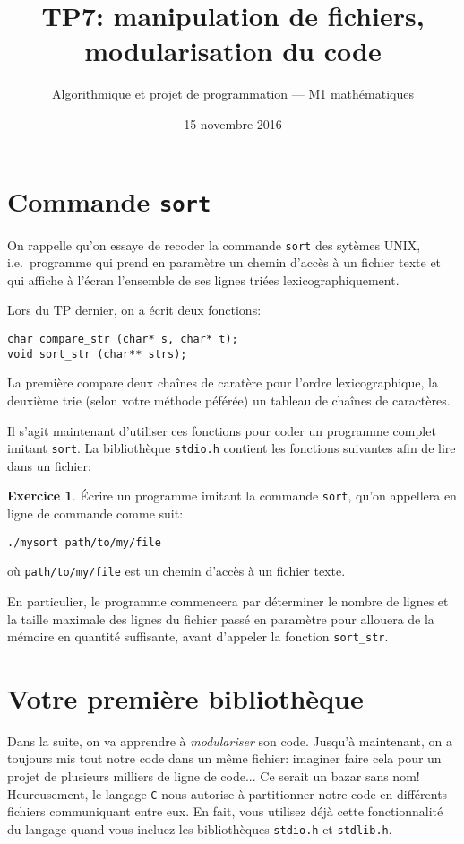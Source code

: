 \documentclass[french,a4paper]{article}
\title{\sffamily TP7: manipulation de fichiers, modularisation du code}%
\date{15 novembre 2016}%
\author{Algorithmique et projet de programmation --- M1
  mathématiques}%
\theoremstyle{definition}
\newtheorem{exercise}{Exercice}
\theoremstyle{remark}
\newcommand{\shell}[1]{\lstinline[style={},style=sh]|#1|}
\newcommand{\inlinec}[1]{\lstinline[style=C]°#1°}
\begin{document}
\maketitle

\section{Commande {\tt sort}}
\label{sec:sort-unix}

On rappelle qu'on essaye de recoder la commande \shell{sort} des
sytèmes UNIX, i.e.\ programme qui prend en paramètre un chemin d'accès
à un fichier texte et qui affiche à l'écran l'ensemble de ses lignes
triées lexicographiquement.

Lors du TP dernier, on a écrit deux fonctions:
\begin{lstlisting}
char compare_str (char* s, char* t);
void sort_str (char** strs);
\end{lstlisting}
La première compare deux chaînes de caratère pour l'ordre
lexicographique, la deuxième trie (selon votre méthode péférée) un
tableau de chaînes de caractères.

Il s'agit maintenant d'utiliser ces fonctions pour coder un programme
complet imitant \shell{sort}. La bibliothèque \inlinec{stdio.h}
contient les fonctions suivantes afin de lire dans un fichier:


\begin{exercise}
  \label{ex:sort}%
  \'Ecrire un programme imitant la commande \shell{sort}, qu'on
  appellera en ligne de commande comme suit:
  \begin{lstlisting}[style={},style=sh]
./mysort path/to/my/file
  \end{lstlisting}
  où \shell{path/to/my/file} est un chemin d'accès à un fichier texte.

  En particulier, le programme commencera par déterminer le nombre de
  lignes et la taille maximale des lignes du fichier passé en
  paramètre pour allouera de la mémoire en quantité suffisante, avant
  d'appeler la fonction \inlinec{sort_str}.
\end{exercise}

\section{Votre première bibliothèque}
\label{sec:own-string}

Dans la suite, on va apprendre à {\em modulariser} son code. Jusqu'à
maintenant, on a toujours mis tout notre code dans un même fichier:
imaginer faire cela pour un projet de plusieurs milliers de ligne de
code... Ce serait un bazar sans nom! Heureusement, le langage {\tt C}
nous autorise à partitionner notre code en différents fichiers
communiquant entre eux. En fait, vous utilisez déjà cette
fonctionnalité du langage quand vous incluez les bibliothèques
\inlinec{stdio.h} et \inlinec{stdlib.h}.
\end{document}
